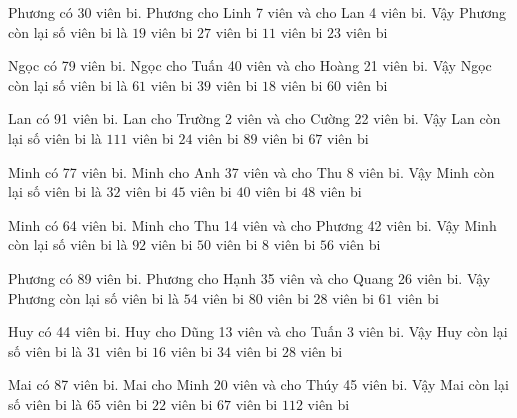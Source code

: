 \documentclass[12pt,a4paper]{article}
\begin{document}
\begin{ex}
Phương có 30 viên bi. Phương cho Linh 7 viên và cho Lan 4 viên bi. Vậy Phương còn lại số viên bi là
 \choice 
{\True $19$ viên bi}
{$27$ viên bi}
{$11$ viên bi}
{$23$ viên bi}
\end{ex}
\begin{ex}
Ngọc có 79 viên bi. Ngọc cho Tuấn 40 viên và cho Hoàng 21 viên bi. Vậy Ngọc còn lại số viên bi là
 \choice 
{$61$ viên bi}
{$39$ viên bi}
{\True $18$ viên bi}
{$60$ viên bi}
\end{ex}
\begin{ex}
Lan có 91 viên bi. Lan cho Trường 2 viên và cho Cường 22 viên bi. Vậy Lan còn lại số viên bi là
 \choice 
{$111$ viên bi}
{$24$ viên bi}
{$89$ viên bi}
{\True $67$ viên bi}
\end{ex}
\begin{ex}
Minh có 77 viên bi. Minh cho Anh 37 viên và cho Thu 8 viên bi. Vậy Minh còn lại số viên bi là
 \choice 
{\True $32$ viên bi}
{$45$ viên bi}
{$40$ viên bi}
{$48$ viên bi}
\end{ex}
\begin{ex}
Minh có 64 viên bi. Minh cho Thu 14 viên và cho Phương 42 viên bi. Vậy Minh còn lại số viên bi là
 \choice 
{$92$ viên bi}
{$50$ viên bi}
{\True $8$ viên bi}
{$56$ viên bi}
\end{ex}
\begin{ex}
Phương có 89 viên bi. Phương cho Hạnh 35 viên và cho Quang 26 viên bi. Vậy Phương còn lại số viên bi là
 \choice 
{$54$ viên bi}
{$80$ viên bi}
{\True $28$ viên bi}
{$61$ viên bi}
\end{ex}
\begin{ex}
Huy có 44 viên bi. Huy cho Dũng 13 viên và cho Tuấn 3 viên bi. Vậy Huy còn lại số viên bi là
 \choice 
{$31$ viên bi}
{$16$ viên bi}
{$34$ viên bi}
{\True $28$ viên bi}
\end{ex}
\begin{ex}
Mai có 87 viên bi. Mai cho Minh 20 viên và cho Thúy 45 viên bi. Vậy Mai còn lại số viên bi là
 \choice 
{$65$ viên bi}
{\True $22$ viên bi}
{$67$ viên bi}
{$112$ viên bi}
\end{ex}
\end{document}
